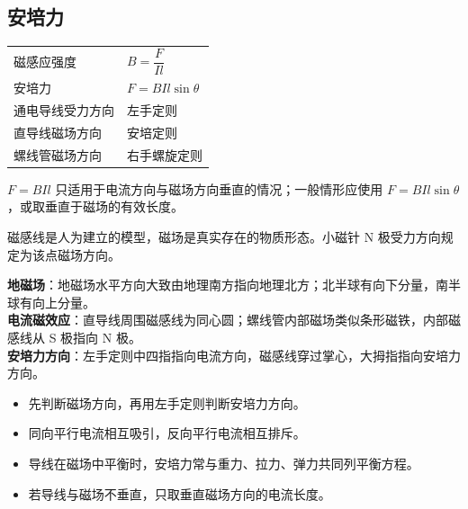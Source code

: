 
\subsection{安培力}

\begin{tabularx}{\columnwidth}{XX}
  磁感应强度&$B=\dfrac{F}{Il}$\\
  安培力&$F=BIl\sin\theta$\\
  通电导线受力方向&左手定则\\
  直导线磁场方向&安培定则\\
  螺线管磁场方向&右手螺旋定则\\
\end{tabularx}

\begin{formulanotebox}
$F=BIl$ 只适用于电流方向与磁场方向垂直的情况；一般情形应使用 $F=BIl\sin\theta$，或取垂直于磁场的有效长度。

磁感线是人为建立的模型，磁场是真实存在的物质形态。小磁针 N 极受力方向规定为该点磁场方向。
\end{formulanotebox}

\begin{keypointbox}[title={\strut\textcolor{white}{\bfseries 重点知识点：磁场方向}}]
\textbf{地磁场}：地磁场水平方向大致由地理南方指向地理北方；北半球有向下分量，南半球有向上分量。\\

\textbf{电流磁效应}：直导线周围磁感线为同心圆；螺线管内部磁场类似条形磁铁，内部磁感线从 S 极指向 N 极。\\

\textbf{安培力方向}：左手定则中四指指向电流方向，磁感线穿过掌心，大拇指指向安培力方向。
\end{keypointbox}

\begin{casetypebox}[title={\strut\textcolor{white}{\bfseries 常见题型：通电导线受力与平衡}}]
\begin{itemize}[leftmargin=1.5em]
  \item 先判断磁场方向，再用左手定则判断安培力方向。
  \item 同向平行电流相互吸引，反向平行电流相互排斥。
  \item 导线在磁场中平衡时，安培力常与重力、拉力、弹力共同列平衡方程。
  \item 若导线与磁场不垂直，只取垂直磁场方向的电流长度。
\end{itemize}
\end{casetypebox}
